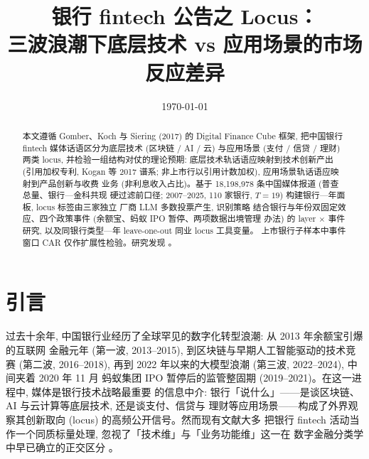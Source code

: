 




\title{银行 fintech 公告之 Locus：\\三波浪潮下底层技术 vs 应用场景的市场反应差异}
\author{}
\date{\today}


\maketitle

\begin{abstract}
本文遵循 Gomber、Koch 与 Siering (2017) 的 Digital Finance Cube 框架, 把中国银行 fintech
媒体话语区分为底层技术 (区块链 / AI / 云) 与应用场景 (支付 / 信贷 / 理财) 两类 locus,
并检验一组结构对仗的理论预期: 底层技术轨话语应映射到技术创新产出 (引用加权专利,
Kogan 等 2017 谱系; 非上市行以引用计数加权), 应用场景轨话语应映射到产品创新与收费
业务 (非利息收入占比)。基于 18{,}198{,}978 条中国媒体报道 (普查总量、银行—金科共现
硬过滤前口径; 2007--2025, 110 家银行, $T=19$) 构建银行—年面板, locus 标签由三家独立
厂商 LLM 多数投票产生, 识别策略
结合银行与年份双固定效应、四个政策事件 (余额宝、蚂蚁 IPO 暂停、两项数据出境管理
办法) 的 layer $\times$ 事件研究, 以及同银行类型—年 leave-one-out 同业 locus 工具变量。
上市银行子样本中事件窗口 CAR 仅作扩展性检验。研究发现 \@。
\end{abstract}

\section{引言}\label{sec:intro}

过去十余年, 中国银行业经历了全球罕见的数字化转型浪潮: 从 2013 年余额宝引爆的互联网
金融元年 (第一波, 2013--2015), 到区块链与早期人工智能驱动的技术竞赛 (第二波,
2016--2018), 再到 2022 年以来的大模型浪潮 (第三波, 2022--2024), 中间夹着 2020 年 11 月
蚂蚁集团 IPO 暂停后的监管整固期 (2019--2021)。在这一进程中, 媒体是银行技术战略最重要
的信息中介: 银行「说什么」——是谈区块链、AI 与云计算等底层技术, 还是谈支付、信贷与
理财等应用场景——构成了外界观察其创新取向 (locus) 的高频公开信号。然而现有文献大多
把银行 fintech 活动当作一个同质标量处理, 忽视了「技术维」与「业务功能维」这一在
数字金融分类学中早已确立的正交区分 \parencite{gomber2017cube,gomber2018fintech}。

